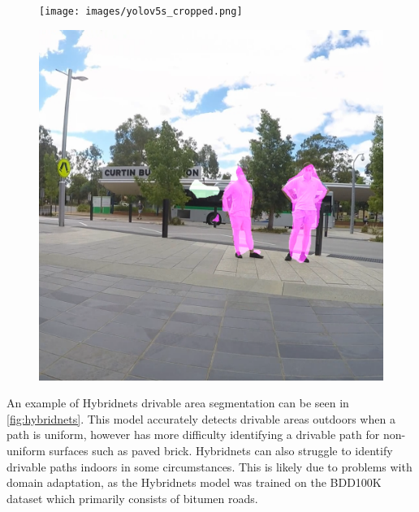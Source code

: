 \begin{figure}[b]
    \centering
    \begin{minipage}[b]{.45\textwidth}
        \centering
        \captionsetup{width=.8\textwidth}
        \texttt{[image: images/yolov5s\_cropped.png]}
        \label{fig:yolov5s}
    \end{minipage}%
    \quad
    \begin{minipage}[b]{.45\textwidth}
        \centering
        \captionsetup{width=.8\textwidth}
        \includegraphics[width=\linewidth]{images/deeplab_cropped.png}
        \label{fig:deeplab}
    \end{minipage}
\end{figure}

An example of Hybridnets drivable area segmentation can be seen in \cref{fig:hybridnets}.
This model accurately detects drivable areas outdoors when a path is uniform, however
has more difficulty identifying a drivable path for non-uniform surfaces such as paved brick.
Hybridnets can also struggle to identify drivable paths indoors in some circumstances.
This is likely due to problems with domain adaptation, as the Hybridnets model was trained on the
BDD100K dataset which primarily consists of bitumen roads.

